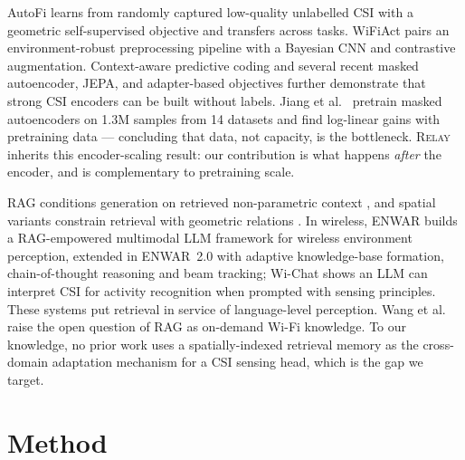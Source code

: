 \documentclass[conference]{IEEEtran}
\newcommand{\method}{\textsc{Relay}}
\begin{document}
AutoFi \cite{Yang2022AutoFi} learns from randomly captured low-quality unlabelled CSI with
a geometric self-supervised objective and transfers across tasks. WiFiAct
\cite{Lyons2024WiFiAct} pairs an environment-robust preprocessing pipeline with a Bayesian
CNN and contrastive augmentation. Context-aware predictive coding \cite{Barahimi2024CPC}
and several recent masked autoencoder, JEPA, and adapter-based objectives further
demonstrate that strong CSI encoders can be built without labels. Jiang et al.\
\cite{Jiang2025Foundation} pretrain masked autoencoders on 1.3M samples from 14 datasets
and find log-linear gains with pretraining data --- concluding that data, not capacity, is
the bottleneck. \method{} inherits this encoder-scaling result: our contribution is what
happens \emph{after} the encoder, and is complementary to pretraining scale.

RAG conditions generation on retrieved non-parametric context \cite{lewis2020rag}, and
spatial variants constrain retrieval with geometric relations \cite{spatial_rag}. In
wireless, ENWAR \cite{Nazar2024Enwar} builds a RAG-empowered multimodal LLM framework for
wireless environment perception, extended in ENWAR~2.0 \cite{Nazar2026Enwar2} with adaptive
knowledge-base formation, chain-of-thought reasoning and beam tracking; Wi-Chat
\cite{wi_chat} shows an LLM can interpret CSI for activity recognition when prompted with
sensing principles. These systems put retrieval in service of language-level perception.
Wang et al.\ \cite{Wang2025GeneralizabilitySurvey} raise the open question of RAG as
on-demand Wi-Fi knowledge. To our knowledge, no prior work uses a spatially-indexed
retrieval memory as the cross-domain adaptation mechanism for a CSI sensing head, which is
the gap we target. 
\section{Method}
\label{sec:method}
\end{document}
